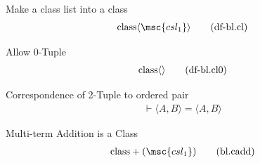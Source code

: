 \begin{metadefinition} {Make a class list into a class}
\begin{align}
{\rm class} \langle \msc{csl_1} \rangle\label{eq:df-bl.cl}\tag{df-bl.cl}
\end{align}
\end{metadefinition}


\begin{metadefinition} {Allow 0-Tuple}
\begin{align}
{\rm class} \langle \rangle\label{eq:df-bl.cl0}\tag{df-bl.cl0}
\end{align}
\end{metadefinition}


\begin{metadefinition} {Correspondence of 2-Tuple to
ordered pair}
\begin{align}
\vdash \langle A , B \rangle = \langle A , B
    \rangle\label{eq:df-bl.2teqop}\tag{df-bl.2teqop}
\end{align}
\end{metadefinition}


\begin{metadefinition} {Multi-term Addition is a Class}
\begin{align}
{\rm class} +( \msc{csl_1} )\label{eq:bl.cadd}\tag{bl.cadd}
\end{align}
\end{metadefinition}


